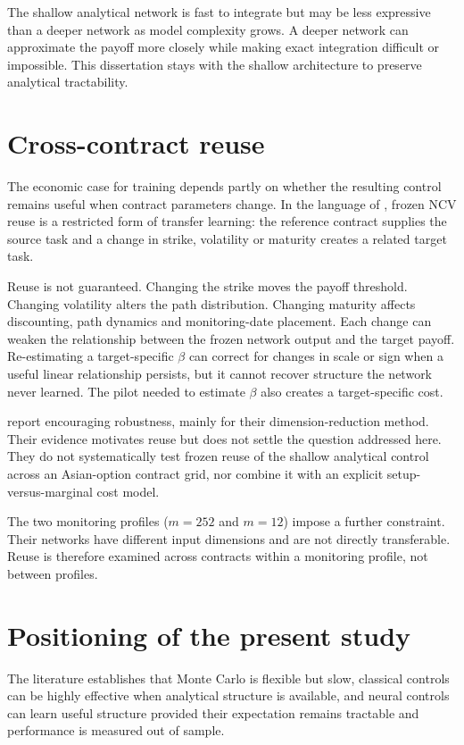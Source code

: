 The shallow analytical network is fast to integrate but may be less expressive than a deeper network as model complexity grows. A deeper network can approximate the payoff more closely while making exact integration difficult or impossible. This dissertation stays with the shallow architecture to preserve analytical tractability.

\section{Cross-contract reuse}

The economic case for training depends partly on whether the resulting control remains useful when contract parameters change. In the language of \textcite{pan_yang_2010}, frozen NCV reuse is a restricted form of transfer learning: the reference contract supplies the source task and a change in strike, volatility or maturity creates a related target task.

Reuse is not guaranteed. Changing the strike moves the payoff threshold. Changing volatility alters the path distribution. Changing maturity affects discounting, path dynamics and monitoring-date placement. Each change can weaken the relationship between the frozen network output and the target payoff. Re-estimating a target-specific $\beta$ can correct for changes in scale or sign when a useful linear relationship persists, but it cannot recover structure the network never learned. The pilot needed to estimate $\beta$ also creates a target-specific cost.

\textcite{el_filali_ech-chafiq_lelong_reghai_2021} report encouraging robustness, mainly for their dimension-reduction method. Their evidence motivates reuse but does not settle the question addressed here. They do not systematically test frozen reuse of the shallow analytical control across an Asian-option contract grid, nor combine it with an explicit setup-versus-marginal cost model.

The two monitoring profiles ($m=252$ and $m=12$) impose a further constraint. Their networks have different input dimensions and are not directly transferable. Reuse is therefore examined across contracts within a monitoring profile, not between profiles.

\section{Positioning of the present study}

The literature establishes that Monte Carlo is flexible but slow, classical controls can be highly effective when analytical structure is available, and neural controls can learn useful structure provided their expectation remains tractable and performance is measured out of sample.

